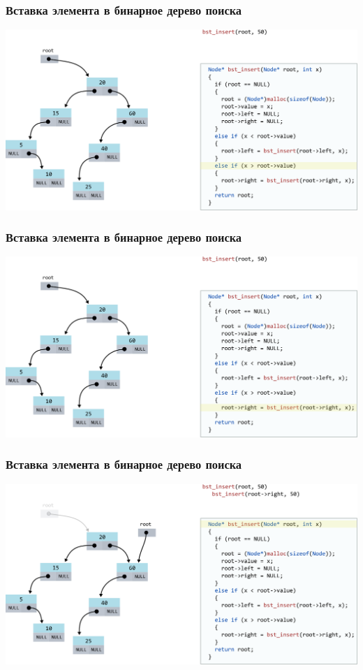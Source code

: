 \documentclass[10pt,pdf,hyperref={unicode}]{beamer}
\begin{document}
\begin{frame}[fragile]
\frametitle{Вставка элемента в бинарное дерево поиска}
\begin{center}
\includegraphics[scale=0.6]{images/tree/codetree/codetree2.png}
\end{center}
\end{frame}
\begin{frame}[fragile]
\frametitle{Вставка элемента в бинарное дерево поиска}
\begin{center}
\includegraphics[scale=0.6]{images/tree/codetree/codetree3.png}
\end{center}
\end{frame}
\begin{frame}[fragile]
\frametitle{Вставка элемента в бинарное дерево поиска}
\begin{center}
\includegraphics[scale=0.6]{images/tree/codetree/codetree4.png}
\end{center}
\end{frame}
\end{document}
